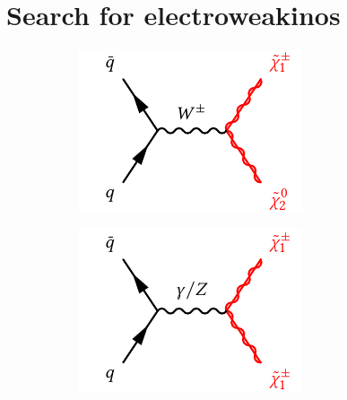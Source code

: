 \section{Search for electroweakinos}

\begin{figure}
	\centering
	\begin{subfigure}[b]{0.33\linewidth}
		\centering\includegraphics[width=.9\textwidth]{electroweakino_production_1}
		\caption{\label{fig:electroweakino_production_1}}
	\end{subfigure}%
	\begin{subfigure}[b]{0.33\linewidth}
		\centering\includegraphics[width=.9\textwidth]{electroweakino_production_2}
		\caption{\label{fig:electroweakino_production_2}}
	\end{subfigure}%
	\begin{subfigure}[b]{0.33\linewidth}

\end{subfigure}
\end{figure}
